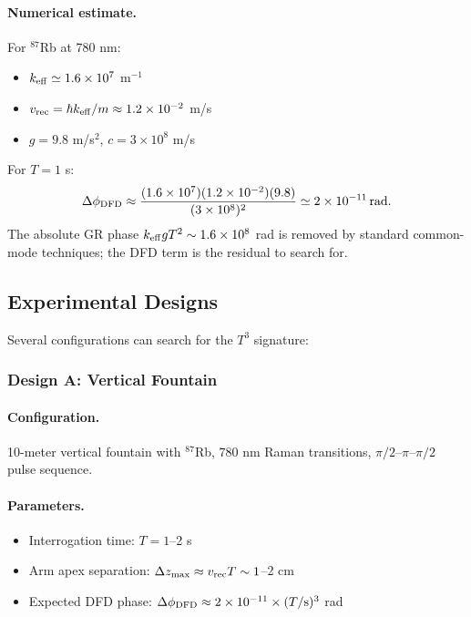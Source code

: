 \paragraph{Numerical estimate.}
For $^{87}$Rb at 780 nm:
\begin{itemize}
\item $k_{\rm eff} \simeq 1.6 \times 10^7$ m$^{-1}$
\item $v_{\rm rec} = \hbar k_{\rm eff}/m \approx 1.2 \times 10^{-2}$ m/s
\item $g = 9.8$ m/s$^2$, $c = 3 \times 10^8$ m/s
\end{itemize}
For $T = 1$ s:
\begin{equation}
\Delta\phi_{\rm DFD} \approx \frac{(1.6 \times 10^7)(1.2 \times 10^{-2})(9.8)}{(3 \times 10^8)^2} \simeq 2 \times 10^{-11}\,\text{rad}.
\end{equation}
The absolute GR phase $k_{\rm eff} g T^2 \sim 1.6 \times 10^8$ rad is removed by standard common-mode techniques; the DFD term is the residual to search for.

\subsection{Experimental Designs}\label{sec:mw-designs}

Several configurations can search for the $T^3$ signature:

\subsubsection{Design A: Vertical Fountain}

\paragraph{Configuration.}
10-meter vertical fountain with $^{87}$Rb, 780 nm Raman transitions, $\pi/2$--$\pi$--$\pi/2$ pulse sequence.

\paragraph{Parameters.}
\begin{itemize}
\item Interrogation time: $T = 1$--2 s
\item Arm apex separation: $\Delta z_{\max} \approx v_{\rm rec} T \sim 1$--2 cm
\item Expected DFD phase: $\Delta\phi_{\rm DFD} \approx 2 \times 10^{-11} \times (T/\text{s})^3$ rad
\end{itemize}

